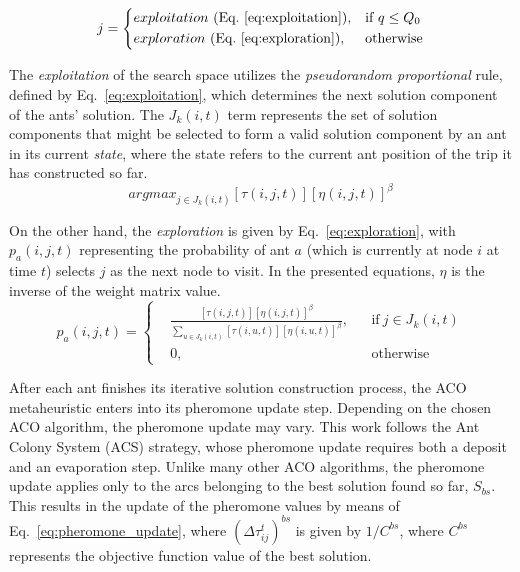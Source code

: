 \begin{equation}
  \label{eq:selection_rule}
  j =  \left \{
    \begin{aligned}
      & exploitation \ (\text{Eq.} \ \ref{eq:exploitation}) , && \text{if}\ q \leq Q_0 \\
      & exploration \ (\text{Eq.} \ \ref{eq:exploration}), && \text{otherwise}
    \end{aligned} \right. 
\end{equation}

The \textit{exploitation} of the search space utilizes the \textit{pseudorandom proportional} rule, defined by Eq.~\ref{eq:exploitation}, which determines the next solution component of the ants' solution. The $J_k(i,t)$ term represents the set of solution components that might be selected to form a valid solution component by an ant in its current \textit{state}, where the state refers to the current ant position of the trip it has constructed so far.
\begin{equation}
  \label{eq:exploitation}
    arg max_{j \in J_k(i,t)} {[\tau(i,j,t)][\eta(i,j,t)]^\beta}
\end{equation}

On the other hand, the \textit{exploration} is given by Eq.~\ref{eq:exploration}, with $p_a(i,j,t)$ representing the probability of ant $a$ (which is currently at node $i$ at time $t$) selects $j$ as the next node to visit.
In the presented equations, $\eta$ is the inverse of the weight matrix value.
\begin{equation}
\label{eq:exploration}
  p_a(i,j,t) =  \left \{
    \begin{aligned}
      & \frac{[\tau(i,j,t)][\eta(i,j,t)]^\beta}{\sum_{u \in J_k(i,t)}[\tau(i,u,t)][\eta(i,u,t)]^\beta}, && \text{if}\ j \in J_k(i,t) \\
      &0, && \text{otherwise}
    \end{aligned} \right. 
\end{equation}


After each ant finishes its iterative solution construction process, the ACO metaheuristic enters into its pheromone update step. Depending on the chosen ACO algorithm, the pheromone update may vary. This work follows the Ant Colony System (ACS) strategy, whose pheromone update requires both a deposit and an evaporation step. Unlike many other ACO algorithms, the pheromone update applies only to the arcs belonging to the best solution found so far, $S_{bs}$. This results in the update of the pheromone values by means of Eq.~\ref{eq:pheromone_update}, where $(\Delta\tau_{ij}^{t})^{bs}$ is given by $1/C^{bs}$, where $C^{bs}$ represents the objective function value of the best solution.


